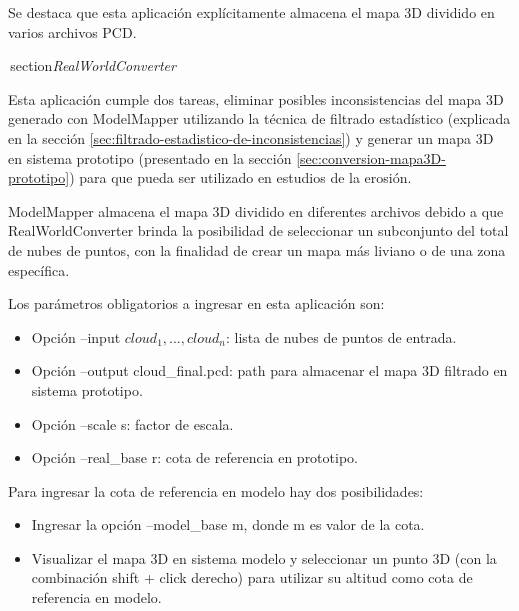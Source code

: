 Se destaca que esta aplicación explícitamente almacena el mapa 3D dividido en varios archivos PCD. 

\,section{\textit{RealWorldConverter}}
 
Esta aplicación cumple dos tareas, eliminar posibles inconsistencias del mapa 3D generado con ModelMapper utilizando la técnica de filtrado estadístico (explicada en la sección \ref{sec:filtrado-estadistico-de-inconsistencias}) y generar un mapa 3D en sistema prototipo (presentado en la sección \ref{sec:conversion-mapa3D-prototipo}) para que pueda ser utilizado en estudios de la erosión.

ModelMapper almacena el mapa 3D dividido en diferentes archivos debido a que RealWorldConverter brinda la posibilidad de seleccionar un subconjunto del total de nubes de puntos, con la finalidad de crear un mapa más liviano o de una zona específica. 

Los parámetros obligatorios a ingresar en esta aplicación son:

\begin{itemize}
\item Opción --input $ cloud_{1}, ..., cloud_{n} $: lista de nubes de puntos de entrada.

\item Opción --output cloud\_final.pcd: path para almacenar el mapa 3D filtrado en sistema prototipo.

\item Opción --scale s: factor de escala.

\item Opción --real\_base r: cota de referencia en prototipo.

\end{itemize}

Para ingresar la cota de referencia en modelo hay dos posibilidades: 
\begin{itemize}

\item Ingresar la opción --model\_base m, donde m es valor de la cota.

\item Visualizar el mapa 3D en sistema modelo y seleccionar un punto 3D (con la combinación shift + click derecho) para utilizar su altitud como cota de referencia en modelo.

\end{itemize}



